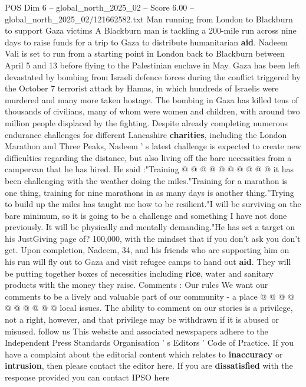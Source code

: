 \begin{textsample}{POS Dim 6 – global\_north\_2025\_02 – Score 6.00 – global\_north\_2025\_02/121662582.txt}  \label{ex:f6_pos_362}
Man running from London to Blackburn to support Gaza victims A Blackburn man is tackling a 200-mile run across nine days to raise funds for a trip to Gaza to distribute humanitarian \textbf{aid}.
Nadeem Vali is set to run from a starting point in London back to Blackburn between April 5 and 13 before flying to the Palestinian enclave in May.
Gaza has been left devastated by bombing from Israeli defence forces during the conflict triggered by the October 7 terrorist attack by Hamas, in which hundreds of Israelis were murdered and many more taken hostage.
The bombing in Gaza has killed tens of thousands of civilians, many of whom were women and children, with around two million people displaced by the fighting.
Despite already completing numerous endurance challenges for different Lancashire \textbf{charities}, including the London Marathon and Three Peaks, Nadeem ' s latest challenge is expected to create new difficulties regarding the distance, but also living off the bare necessities from a campervan that he has hired.
He said :"Training @ @ @ @ @ @ @ @ @ @ it has been challenging with the weather doing the miles."Training for a marathon is one thing, training for nine marathons in as many days is another thing."Trying to build up the miles has taught me how to be resilient."I will be surviving on the bare minimum, so it is going to be a challenge and something I have not done previously.
It will be physically and mentally demanding."He has set a target on his JustGiving page of? 100,000, with the mindset that if you don't ask you don't get.
Upon completion, Nadeem, 34, and his friends who are supporting him on his run will fly out to Gaza and visit refugee camps to hand out \textbf{aid}.
They will be putting together boxes of necessities including \textbf{rice}, water and sanitary products with the money they raise.
Comments : Our rules We want our comments to be a lively and valuable part of our community - a place @ @ @ @ @ @ @ @ @ @ local issues.
The ability to comment on our stories is a privilege, not a right, however, and that privilege may be withdrawn if it is abused or misused. follow us This website and associated newspapers adhere to the Independent Press Standards Organisation ' s Editors ' Code of Practice.
If you have a complaint about the editorial content which relates to \textbf{inaccuracy} or \textbf{intrusion}, then please contact the editor here.
If you are \textbf{dissatisfied} with the response provided you can contact IPSO here

\end{textsample}
